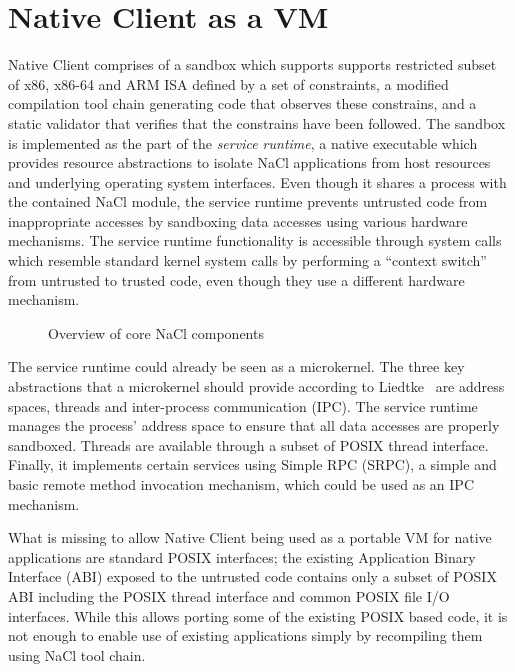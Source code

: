 \section{Native Client as a VM}
\label{sec:overview}

Native Client comprises of a sandbox which supports supports restricted
subset of x86, x86-64 and ARM ISA defined by a set of constraints, a
modified compilation tool chain generating code that observes these
constrains, and a static validator that verifies that the constrains
have been followed.  The sandbox is implemented as the part of the
\emph{service runtime}, a native executable which provides resource
abstractions to isolate NaCl applications from host resources and
underlying operating system interfaces. Even though it shares a process
with the contained NaCl module, the service runtime prevents untrusted
code from inappropriate accesses by sandboxing data accesses using
various hardware mechanisms. The service runtime functionality is
accessible through system calls which resemble standard kernel system
calls by performing a ``context switch'' from untrusted to trusted code,
even though they use a different hardware mechanism.


\begin{figure}
\centering
\caption{Overview of core NaCl components}
\label{fig:overview}
\end{figure}

The service runtime could already be seen as a microkernel. The three key
abstractions that a microkernel should provide according to
Liedtke~\cite{liedtke:sosp93} are address spaces, threads and
inter-process communication (IPC). The service runtime manages the
process' address space to ensure that all data accesses are properly
sandboxed.  Threads are available through a subset of POSIX thread
interface.  Finally, it implements certain services using Simple RPC
(SRPC), a simple and basic remote method invocation mechanism, which
could be used as an IPC mechanism.

What is missing to allow Native Client being used as a portable VM for
native applications are standard POSIX interfaces; the existing
Application Binary Interface (ABI) exposed to the untrusted code
contains only a subset of POSIX ABI including the POSIX thread interface
and common POSIX file I/O interfaces. While this allows porting some of
the existing POSIX based code, it is not enough to enable use of
existing applications simply by recompiling them using NaCl tool chain.

